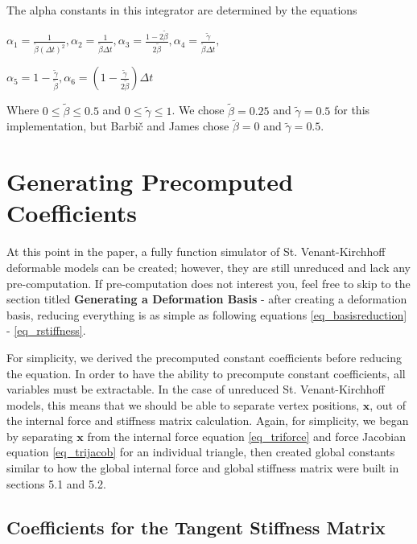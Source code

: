 \documentclass[twocolumn,10pt]{asme2ej}
\begin{document}
\bigskip
The alpha constants in this integrator are determined by the equations

\begin{center}
$\alpha_1 = \frac{1}{\tilde{\beta}(\Delta t)^2}, \alpha_2 = \frac{1}{\tilde{\beta}\Delta t},
\alpha_3 = \frac{1 - 2\tilde{\beta}}{2\tilde{\beta}}, \alpha_4 = \frac{\tilde{\gamma}}{\tilde{\beta}\Delta t},$

$\alpha_5 = 1 - \frac{\tilde{\gamma}}{\tilde{\beta}}, \alpha_6 = \left(1 - \frac{\tilde{\gamma}}{2\tilde{\beta}}\right)\Delta t$
\end{center}

Where $0 \leq \tilde{\beta} \leq 0.5$ and $0 \leq \tilde{\gamma} \leq 1$. We chose $\tilde{\beta} = 0.25$ and $\tilde{\gamma} = 0.5$ for this implementation, but Barbič and James chose $\tilde{\beta} = 0$ and $\tilde{\gamma} = 0.5$.

\section{Generating Precomputed Coefficients}

At this point in the paper, a fully function simulator of St. Venant-Kirchhoff deformable models can be created; however, they are still unreduced and lack any pre-computation. If pre-computation does not interest you, feel free to skip to the section titled \textbf{Generating a Deformation Basis} - after creating a deformation basis, reducing everything is as simple as following equations \ref{eq_basisreduction} - \ref{eq_rstiffness}.

For simplicity, we derived the precomputed constant coefficients before reducing the equation. In order to have the ability to precompute constant coefficients, all variables must be extractable. In the case of unreduced St. Venant-Kirchhoff models, this means that we should be able to separate vertex positions, $\bm{x}$, out of the internal force and stiffness matrix calculation. Again, for simplicity, we began by separating $\bm{x}$ from the internal force equation \ref{eq_triforce} and force Jacobian equation \ref{eq_trijacob} for an individual triangle, then created global constants similar to how the global internal force and global stiffness matrix were built in sections 5.1 and 5.2.

\subsection{Coefficients for the Tangent Stiffness Matrix}
\end{document}
